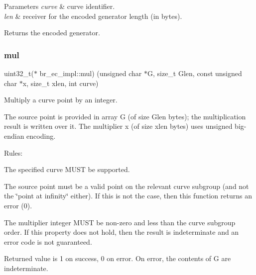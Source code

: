 \begin{DoxyParams}{Parameters}
{\em curve} & curve identifier. \\
\hline
{\em len} & receiver for the encoded generator length (in bytes). \\
\hline
\end{DoxyParams}
\begin{DoxyReturn}{Returns}
the encoded generator. 
\end{DoxyReturn}
\mbox{\label{structbr__ec__impl_abc4f4ce448754b7f93632a284bfe4b3d}} 
\subsubsection{\texorpdfstring{mul}{mul}}
{\footnotesize\ttfamily uint32\+\_\+t($\ast$ br\+\_\+ec\+\_\+impl\+::mul) (unsigned char $\ast$G, size\+\_\+t Glen, const unsigned char $\ast$x, size\+\_\+t xlen, int curve)}



Multiply a curve point by an integer. 

The source point is provided in array {\ttfamily G} (of size {\ttfamily Glen} bytes); the multiplication result is written over it. The multiplier {\ttfamily x} (of size {\ttfamily xlen} bytes) uses unsigned big-\/endian encoding.

Rules\+:


\begin{DoxyItemize}
\item The specified curve M\+U\+ST be supported.
\item The source point must be a valid point on the relevant curve subgroup (and not the \char`\"{}point at infinity\char`\"{} either). If this is not the case, then this function returns an error (0).
\item The multiplier integer M\+U\+ST be non-\/zero and less than the curve subgroup order. If this property does not hold, then the result is indeterminate and an error code is not guaranteed.
\end{DoxyItemize}

Returned value is 1 on success, 0 on error. On error, the contents of {\ttfamily G} are indeterminate.


